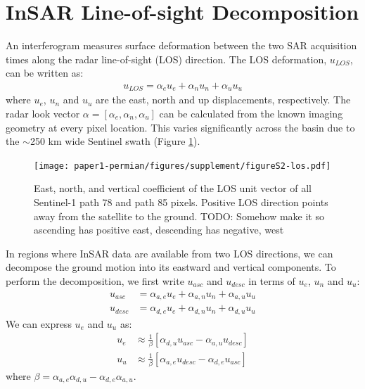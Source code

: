 \section{InSAR Line-of-sight Decomposition}
\label{sec:ch3-insar-decomp}
An interferogram measures surface deformation between the two SAR acquisition times along the radar line-of-sight (LOS) direction. The LOS deformation, $u_{LOS}$, can be written as: 
\begin{align}
	u_{LOS}= \alpha_{e} u_{e} + \alpha_{n} u_{n} + \alpha_{u} u_{u}
\end{align}
where $u_{e}$, $u_{n}$ and $u_{u}$ are the east, north and up displacements, respectively. The radar look vector $\alpha = [\alpha_e, \alpha_n, \alpha_u]$ can be calculated from the known imaging geometry at every pixel location. This varies significantly across the basin due to the $ \sim$250 km wide Sentinel swath (Figure \ref{fig:los-map}). 


%

\begin{figure}[!htbp]
	\centering
	\texttt{[image: paper1-permian/figures/supplement/figureS2-los.pdf]}
	\caption[East, north, and vertical coefficients of Sentinel-1 LOS vectors]{East, north, and vertical coefficient of the LOS unit vector of all Sentinel-1 path 78 and path 85 pixels. Positive LOS direction points away from the satellite to the ground.
	TODO: Somehow make it so ascending has positive east, descending has negative, west}
	\label{fig:los-map}
\end{figure}

In regions where InSAR data are available from two LOS directions, we can decompose the ground motion into its eastward and vertical components.
To perform the decomposition, we first write $u_{asc}$ and $u_{desc}$ in terms of $u_e$, $u_n$ and $u_u$:
\begin{align}
	u_{asc} &= \alpha_{a,e} u_{e} + \alpha_{a,n} u_{n} + \alpha_{a,u} u_{u}\\
	u_{desc} &= \alpha_{d,e} u_{e} + \alpha_{d,n} u_{n} + \alpha_{d,u} u_{u}
\end{align}
We can express $u_e$ and $u_u$ as:
\begin{align}
	u_{e} &\approx  \frac{1}{\beta}  \left[\alpha_{d,u}  u_{asc} - \alpha_{a,u} u_{desc} \right] \\
	u_{u} &\approx  \frac{1}{\beta}  \left[\alpha_{a,e} u_{desc} - \alpha_{d,e}  u_{asc}  \right] 
\end{align}
where  $ \beta = {\alpha_{a,e} \alpha_{d,u}- \alpha_{d,e} \alpha_{a,u}} $.

